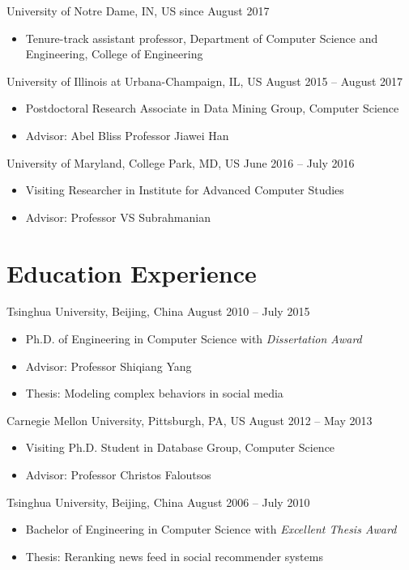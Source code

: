 \documentclass[margin, 9pt]{res}
\begin{document}
\begin{resume}
{University of Notre Dame, IN, US} \hfill{since August 2017}
\begin{itemize}
	\item Tenure-track assistant professor, Department of Computer Science and Engineering, College of Engineering
\end{itemize}
\vspace{-0.1in}
{University of Illinois at Urbana-Champaign, IL, US} \hfill{August 2015 -- August 2017}
\begin{itemize}
	\item Postdoctoral Research Associate in Data Mining Group, Computer Science
	\item Advisor: Abel Bliss Professor Jiawei Han
\end{itemize}
\vspace{-0.1in}
{University of Maryland, College Park, MD, US} \hfill{June 2016 -- July 2016}
\begin{itemize}
	\item Visiting Researcher in Institute for Advanced Computer Studies
	\item Advisor: Professor VS Subrahmanian
\end{itemize}


\section{Education Experience}

{Tsinghua University, Beijing, China} \hfill{August 2010 -- July 2015}
\begin{itemize}
\item Ph.D. of Engineering in Computer Science with \textit{Dissertation Award}
\item Advisor: Professor Shiqiang Yang
\item Thesis: Modeling complex behaviors in social media
\end{itemize}
\vspace{-0.1in}
{Carnegie Mellon University, Pittsburgh, PA, US} \hfill{August 2012 -- May 2013}
\begin{itemize}
\item Visiting Ph.D. Student in Database Group, Computer Science
\item Advisor: Professor Christos Faloutsos
\end{itemize}
\vspace{-0.1in}
{Tsinghua University, Beijing, China} \hfill{August 2006 -- July 2010}
\begin{itemize}
\item Bachelor of Engineering in Computer Science with \textit{Excellent Thesis Award}
\item Thesis: Reranking news feed in social recommender systems
\end{itemize}


\end{resume}
\end{document}
